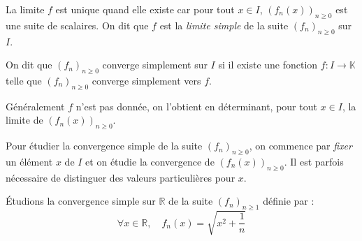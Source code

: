 \documentclass[a4paper,10pt]{report}
\begin{document}
\begin{rems} 
\item La limite $f$ est unique quand elle existe car pour tout $x \in I$, $(f_n(x))_{n \geq 0}$ est une suite de scalaires. On dit que $f$ est la \textit{limite simple} de la suite $(f_n)_{n \geq 0}$ sur $I$.
\item On dit que $(f_n)_{n \geq 0}$ converge simplement sur $I$ si il existe une fonction $f : I \rightarrow \mathbb{K}$ telle que $(f_n)_{n \geq 0}$ converge simplement vers $f$.
\item Généralement $f$ n'est pas donnée, on l'obtient en déterminant, pour tout $x \in I$, la limite de $(f_n(x))_{n \geq 0}$.
\end{rems}

\begin{metho} Pour étudier la convergence simple de la suite $(f_n)_{n \geq 0}$, on commence par \textit{fixer} un élément $x$ de $I$ et on étudie la convergence de $(f_n(x))_{n \geq 0}$. Il est parfois nécessaire de distinguer des valeurs particulières pour $x$.
\end{metho}

\medskip

\begin{ex}\label{PremierEx} Étudions la convergence simple sur $\mathbb{R}$ de la suite $(f_n)_{n \geq 1}$ définie par :
$$ \forall x \in \mathbb{R}, \quad f_n(x) = \sqrt{x^2 + \frac{1}{n}}$$

\medskip

\vspace{7.5cm}

\end{ex}
\end{document}
